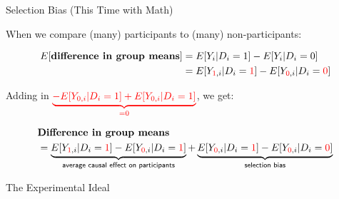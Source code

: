 \documentclass[10pt,xcolor=table,ignorenonframetext,handout,aspectratio=169]{beamer}
\begin{document}

\begin{frame}{Selection Bias (This Time with Math)}

\medskip
When we compare (many) participants to (many) non-participants:
\begin{small}
	\begingroup
	\addtolength{\jot}{1em}
	\begin{align*}
	E [ \textbf{difference in group means} ] &= E [ Y_i \vert D_i = 1 ] - E [ Y_i \vert D_i = 0 ]\\
	& = E [ Y_{\color{red}1 \color{black},i} \vert D_i = \color{red}1\color{black} ]
	- E [ Y_{\color{red}0\color{black},i} \vert D_i = \color{red}0\color{black} ]
	\end{align*}
	\endgroup
\end{small}

\pause
\medskip
Adding in $\color{red}\underbrace{- E [ Y_{ 0 ,i} \vert D_i = 1 ] + E [ Y_{0 ,i} \vert D_i = 1]}_{= 0}$, we get:
\begin{small}
	\begingroup
	\addtolength{\jot}{1em}
	\begin{align*}
	& \textbf{Difference in group means} \\
	& = \underbrace{E [ Y_{\color{red}1 \color{black},i} \vert D_i = \color{red}1\color{black} ]
		- E [ Y_{\color{red}0\color{black},i} \vert D_i = \color{red}1\color{black} ]}_{\textsf{average causal effect on participants}}
	+ \underbrace{E [ Y_{\color{red}0\color{black},i} \vert D_i = \color{red}1\color{black} ]
		- E [ Y_{\color{red}0\color{black},i} \vert D_i = \color{red}0\color{black} ]}_{\textsf{selection bias}}
	\end{align*}
	\endgroup
\end{small}

\end{frame}



\begin{frame}[plain]
\begin{center}
	
	\Large{\textcolor{williams}{The Experimental Ideal}}
	
\end{center}
\end{frame}
\end{document}
